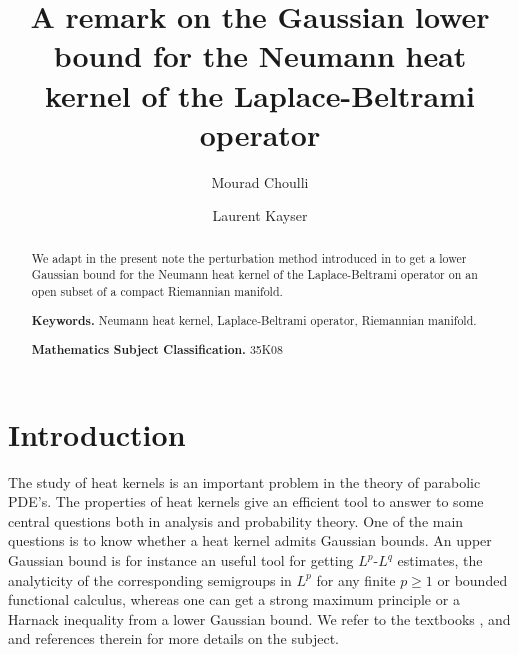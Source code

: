 \documentclass{birkjour}
\begin{document}
\title[Gaussian lower bound]{A remark on the Gaussian lower bound for the Neumann heat kernel of the Laplace-Beltrami operator}

\author[Mourad Choulli]{Mourad Choulli}
\address{Institut \'Elie Cartan de Lorraine, UMR CNRS 7502, Universit\'e de Lorraine, Boulevard des Aiguillettes, BP 70239, 54506 Vandoeuvre les Nancy cedex - Ile du Saulcy, 57045 Metz cedex 01, France}
\author[Laurent Kayser]{Laurent Kayser}
\address{Institut \'Elie Cartan de Lorraine, UMR CNRS 7502, Universit\'e de Lorraine, Boulevard des Aiguillettes, BP 70239, 54506 Vandoeuvre les Nancy cedex - Ile du Saulcy, 57045 Metz cedex 01, France}




\date{}



\begin{abstract}
We adapt in the present  note the perturbation method introduced in \cite{CK} to get a lower Gaussian bound for the Neumann heat kernel of the Laplace-Beltrami operator on an open subset of a compact Riemannian manifold. 
 
 \smallskip
 \noindent
 {\bf Keywords.} Neumann heat kernel, Laplace-Beltrami operator, Riemannian manifold.
 
 \smallskip
 \noindent
 {\bf Mathematics Subject Classification.} 35K08
\end{abstract}

\maketitle



\section{Introduction}


The study of heat kernels  is an important problem in the theory of parabolic PDE's. The properties of heat kernels give an efficient tool to answer to some central questions  both in analysis and probability theory. One of the main questions is to know whether a heat kernel  admits Gaussian bounds. An upper Gaussian bound is for instance an useful tool for getting $L^p$-$L^q$ estimates, the analyticity of the corresponding semigroups in $L^p$ for any finite $p\geq1$ or bounded functional calculus, whereas one can get a strong maximum principle or a Harnack inequality from a  lower Gaussian bound. We refer to the textbooks \cite{Dav}, \cite{Ou} and \cite{St} and references therein for more details on the subject.
\end{document}
